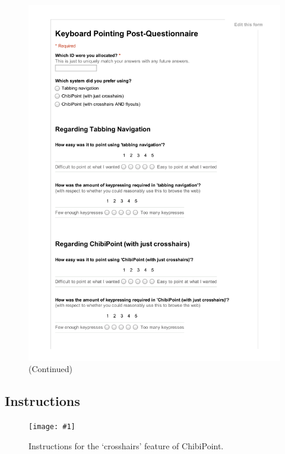 \documentclass[11pt,openright,a4paper]{report}
\newcommand{\safefigheight}{\dimexpr\textheight-1.1\baselineskip-\abovecaptionskip-\belowcaptionskip\relax}
\begin{document}
\begin{figure}[ht]
\ContinuedFloat
\includegraphics[page=2,width=\textwidth,height=\safefigheight,keepaspectratio]{sheets/PostQuestionnaire.pdf}
\caption{ (Continued)}
\end{figure}

\FloatBarrier
\subsection{Instructions}
\label{sec:instructions}
\newcommand{\somesheet}[1]{\centering\texttt{[image: \#1]}}

\newcommand{\instructionssheet}[1]{\somesheet{instructions/#1.png}}
\begin{figure}[ht]
\instructionssheet{ChibiPointDrillInstructions}
\caption{Instructions for the `crosshairs' feature of ChibiPoint.}
\label{fig:instructions_crosshairs}
\end{figure}
\end{document}
